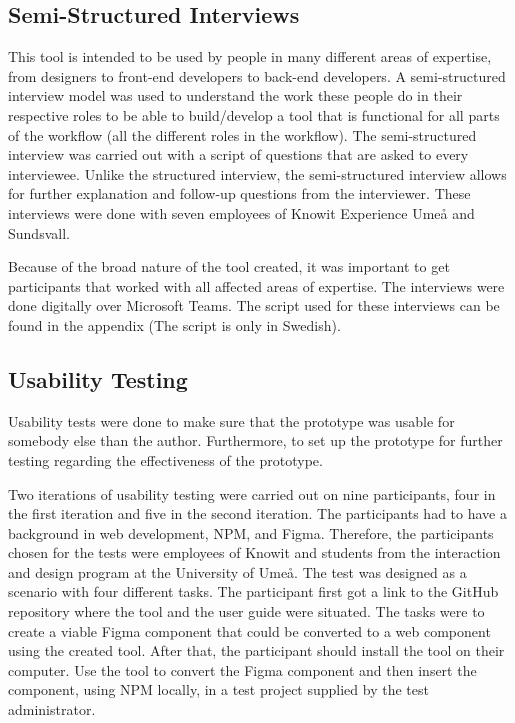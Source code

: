 \subsection{Semi-Structured Interviews}%
\label{sub:inteviews}
This tool is intended to be used by people in many different areas of expertise, from designers to front-end developers to back-end developers. A semi-structured interview model was used \cite{galletta2013mastering} to understand the work these people do in their respective roles to be able to build/develop a tool that is functional for all parts of the workflow (all the different roles in the workflow). The semi-structured interview was carried out with a script of questions that are asked to every interviewee. Unlike the structured interview, the semi-structured interview allows for further explanation and follow-up questions from the interviewer. These interviews were done with seven employees of Knowit Experience Umeå and Sundsvall. 

Because of the broad nature of the tool created, it was important to get participants that worked with all affected areas of expertise. The interviews were done digitally over Microsoft Teams. The script used for these interviews can be found in the appendix (The script is only in Swedish). 






\subsection{Usability Testing}%
\label{sub:usertesting}
Usability tests were done to make sure that the prototype was usable for somebody else than the author. Furthermore, to set up the prototype for further testing regarding the effectiveness of the prototype.

Two iterations of usability testing were carried out on nine participants, four in the first iteration and five in the second iteration. The participants had to have a background in web development, NPM, and Figma. Therefore, the participants chosen for the tests were employees of Knowit and students from the interaction and design program at the University of Umeå. The test was designed as a scenario with four different tasks. The participant first got a link to the GitHub repository where the tool and the user guide were situated. The tasks were to create a viable Figma component that could be converted to a web component using the created tool. After that, the participant should install the tool on their computer. Use the tool to convert the Figma component and then insert the component, using NPM locally, in a test project supplied by the test administrator.

